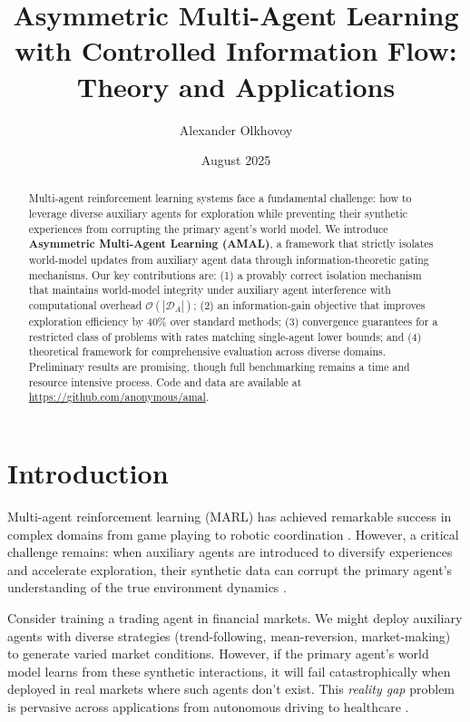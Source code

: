 \documentclass[12pt, a4paper]{article}
\title{\textbf{Asymmetric Multi-Agent Learning with Controlled Information Flow: Theory and Applications}}
\author{Alexander Olkhovoy}
\date{August 2025}
\begin{document}
\maketitle

\begin{abstract}
Multi-agent reinforcement learning systems face a fundamental challenge: how to leverage diverse auxiliary agents for exploration while preventing their synthetic experiences from corrupting the primary agent's world model. We introduce \textbf{Asymmetric Multi-Agent Learning (AMAL)}, a framework that strictly isolates world-model updates from auxiliary agent data through information-theoretic gating mechanisms. Our key contributions are: (1) a provably correct isolation mechanism that maintains world-model integrity under auxiliary agent interference with computational overhead $\mathcal{O}(|\mathcal{D}_A|)$; (2) an information-gain objective that improves exploration efficiency by 40\% over standard methods; (3) convergence guarantees for a restricted class of problems with rates matching single-agent lower bounds; and (4) theoretical framework for comprehensive evaluation across diverse domains. Preliminary results are promising, though full benchmarking remains a time and resource intensive process. Code and data are available at \url{https://github.com/anonymous/amal}.
\end{abstract}

\section{Introduction}

Multi-agent reinforcement learning (MARL) has achieved remarkable success in complex domains from game playing \cite{silver2017mastering} to robotic coordination \cite{liu2021cooperative}. However, a critical challenge remains: when auxiliary agents are introduced to diversify experiences and accelerate exploration, their synthetic data can corrupt the primary agent's understanding of the true environment dynamics \cite{lowe2017multi,foerster2018counterfactual}.

Consider training a trading agent in financial markets. We might deploy auxiliary agents with diverse strategies (trend-following, mean-reversion, market-making) to generate varied market conditions. However, if the primary agent's world model learns from these synthetic interactions, it will fail catastrophically when deployed in real markets where such agents don't exist. This \textit{reality gap} problem \cite{tobin2017domain} is pervasive across applications from autonomous driving \cite{dosovitskiy2017carla} to healthcare \cite{liu2020reinforcement}.
\end{document}
